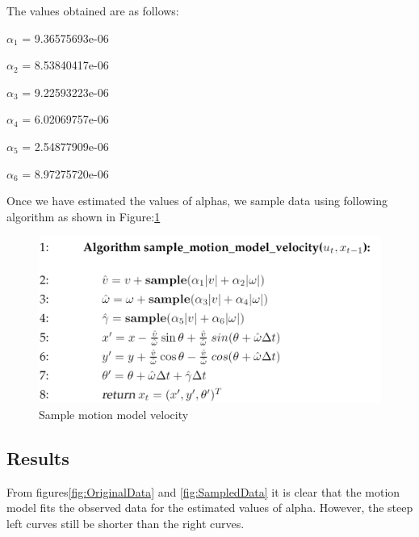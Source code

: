 \documentclass[10pt]{scrartcl}
\begin{document}
The values obtained are as follows: 

$\alpha_1$ =  9.36575693e-06 

$\alpha_2$ =  8.53840417e-06

$\alpha_3$ =  9.22593223e-06

$\alpha_4$ =  6.02069757e-06

$\alpha_5$ =  2.54877909e-06

$\alpha_6$ =  8.97275720e-06
     

Once we have estimated the values of alphas, we sample data using following algorithm as shown in Figure:\ref{fig:samplingmodel}

\begin{figure}[ht!]
\centering
\includegraphics[scale=0.2]{images/sampling-model}
\caption{Sample motion model velocity \cite{MotionModel}}
\label{fig:samplingmodel}
\end{figure}

\subsection{Results}

From figures\ref{fig:OriginalData} and \ref{fig:SampledData} it is clear that the motion model fits the observed data for the estimated values of alpha. However, the steep left curves still be shorter than the right curves. 
\end{document}
